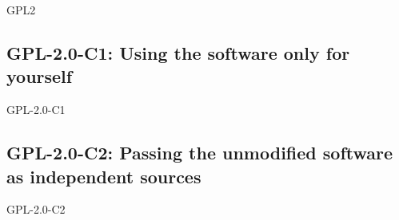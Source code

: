 
\newcommand{\ver}{2.0}

\begin{license}{GPL2} 

\subsection{GPL-\ver-C1: Using the software only for yourself}
\begin{lsuc}{GPL-\ver-C1}

  \useCaseOne{\ver}
  \coversOne

  \begin{lsucrequiresnothing}
  \end{lsucrequiresnothing}

  \lsucprohibitsnothing
\end{lsuc}

\subsection{GPL-\ver-C2: Passing the unmodified software as independent sources}
\begin{lsuc}{GPL-\ver-C2}

  \useCaseTwo{\ver}
  \coversTwo

  \begin{lsucrequires}
    \lsucmandatory{\keepLicenseElements}
    \lsucmandatory{\gpltwoEnsureCopyrightNoticeSource}
    \lsucmandatory{\giveLicense}\passingFilesCorrectly
    \lsucmandatory{\retainCopyrightNotices}
    \lsucoptional{\addToDocumentation}
  \end{lsucrequires}

  \lsucprohibitsnothing
\end{lsuc}


\end{license}
